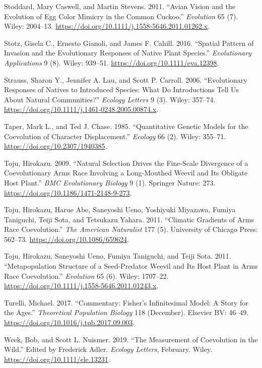 \documentclass[]{article}
\begin{document}
\leavevmode\hypertarget{ref-Stoddard2011}{}%
Stoddard, Mary Caswell, and Martin Stevens. 2011. ``Avian Vision and the
Evolution of Egg Color Mimicry in the Common Cuckoo.'' \emph{Evolution}
65 (7). Wiley: 2004--13.
\url{https://doi.org/10.1111/j.1558-5646.2011.01262.x}.

\leavevmode\hypertarget{ref-Stotz2016}{}%
Stotz, Gisela C., Ernesto Gianoli, and James F. Cahill. 2016. ``Spatial
Pattern of Invasion and the Evolutionary Responses of Native Plant
Species.'' \emph{Evolutionary Applications} 9 (8). Wiley: 939--51.
\url{https://doi.org/10.1111/eva.12398}.

\leavevmode\hypertarget{ref-Strauss2006}{}%
Strauss, Sharon Y., Jennifer A. Lau, and Scott P. Carroll. 2006.
``Evolutionary Responses of Natives to Introduced Species: What Do
Introductions Tell Us About Natural Communities?'' \emph{Ecology
Letters} 9 (3). Wiley: 357--74.
\url{https://doi.org/10.1111/j.1461-0248.2005.00874.x}.

\leavevmode\hypertarget{ref-Taper1985}{}%
Taper, Mark L., and Ted J. Chase. 1985. ``Quantitative Genetic Models
for the Coevolution of Character Displacement.'' \emph{Ecology} 66 (2).
Wiley: 355--71. \url{https://doi.org/10.2307/1940385}.

\leavevmode\hypertarget{ref-Toju2009}{}%
Toju, Hirokazu. 2009. ``Natural Selection Drives the Fine-Scale
Divergence of a Coevolutionary Arms Race Involving a Long-Mouthed Weevil
and Its Obligate Host Plant.'' \emph{BMC Evolutionary Biology} 9 (1).
Springer Nature: 273. \url{https://doi.org/10.1186/1471-2148-9-273}.

\leavevmode\hypertarget{ref-Toju2011a}{}%
Toju, Hirokazu, Harue Abe, Saneyoshi Ueno, Yoshiyuki Miyazawa, Fumiya
Taniguchi, Teiji Sota, and Tetsukazu Yahara. 2011. ``Climatic Gradients
of Arms Race Coevolution.'' \emph{The American Naturalist} 177 (5).
University of Chicago Press: 562--73.
\url{https://doi.org/10.1086/659624}.

\leavevmode\hypertarget{ref-Toju2011b}{}%
Toju, Hirokazu, Saneyoshi Ueno, Fumiya Taniguchi, and Teiji Sota. 2011.
``Metapopulation Structure of a Seed-Predator Weevil and Its Host Plant
in Arms Race Coevolution.'' \emph{Evolution} 65 (6). Wiley: 1707--22.
\url{https://doi.org/10.1111/j.1558-5646.2011.01243.x}.

\leavevmode\hypertarget{ref-Turelli2017}{}%
Turelli, Michael. 2017. ``Commentary: Fisher's Infinitesimal Model: A
Story for the Ages.'' \emph{Theoretical Population Biology} 118
(December). Elsevier BV: 46--49.
\url{https://doi.org/10.1016/j.tpb.2017.09.003}.

\leavevmode\hypertarget{ref-Week2019}{}%
Week, Bob, and Scott L. Nuismer. 2019. ``The Measurement of Coevolution
in the Wild.'' Edited by Frederick Adler. \emph{Ecology Letters},
February. Wiley. \url{https://doi.org/10.1111/ele.13231}.
\end{document}

